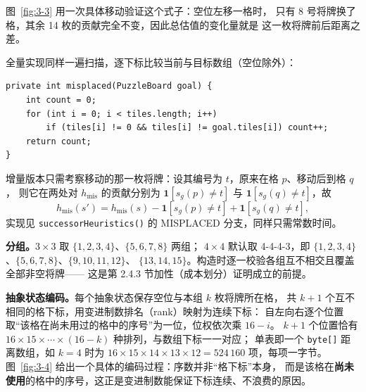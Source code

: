 图~\ref{fig:3-3} 用一次具体移动验证这个式子：空位左移一格时，
只有 8 号将牌换了格，其余 14 枚的贡献完全不变，因此总估值的变化量就是
这一枚将牌前后距离之差。


\par\vspace{2bp}

全量实现同样一遍扫描，逐下标比较当前与目标数组（空位除外）：

{\fontsize{9.5bp}{12bp}\selectfont
\noindent\begin{minipage}{\linewidth}
\begin{verbatim}
private int misplaced(PuzzleBoard goal) {
    int count = 0;
    for (int i = 0; i < tiles.length; i++)
        if (tiles[i] != 0 && tiles[i] != goal.tiles[i]) count++;
    return count;
}
\end{verbatim}
\end{minipage}}

增量版本只需考察移动的那一枚将牌：设其编号为 $t$，原来在格 $p$、移动后到格 $q$，
则它在两处对 $h_{\mathrm{mis}}$ 的贡献分别为 $\mathbf{1}[s_g(p)\neq t]$ 与
$\mathbf{1}[s_g(q)\neq t]$，故
\[
h_{\mathrm{mis}}(s')=h_{\mathrm{mis}}(s)
-\mathbf{1}[s_g(p)\neq t]+\mathbf{1}[s_g(q)\neq t],
\]
实现见 \texttt{successorHeuristics()} 的 MISPLACED 分支，同样只需常数时间。

\par\vspace{2bp}

\textbf{分组。}$3\times3$ 取 $\{1,2,3,4\}$、$\{5,6,7,8\}$ 两组；
$4\times4$ 默认取 4-4-4-3，即 $\{1,2,3,4\}$、$\{5,6,7,8\}$、$\{9,10,11,12\}$、
$\{13,14,15\}$。构造时逐一校验各组互不相交且覆盖全部非空将牌——
这是第 2.4.3 节加性（成本划分）证明成立的前提。

\textbf{抽象状态编码。}每个抽象状态保存空位与本组 $k$ 枚将牌所在格，
共 $k+1$ 个互不相同的格下标，用变进制数排名（rank）映射为连续下标：
自左向右逐个位置取“该格在尚未用过的格中的序号”为一位，位权依次乘 $16-i$。
$k+1$ 个位置恰有 $16\times15\times\cdots\times(16-k)$ 种排列，与数组下标一一对应；
单表即一个 \texttt{byte[]} 距离数组，如 $k=4$ 时为
$16\times15\times14\times13\times12=524\,160$ 项，每项一字节。
图~\ref{fig:3-4} 给出一个具体的编码过程：序数并非“格下标”本身，
而是该格在\textbf{尚未使用}的格中的序号，这正是变进制数能保证下标连续、不浪费的原因。


